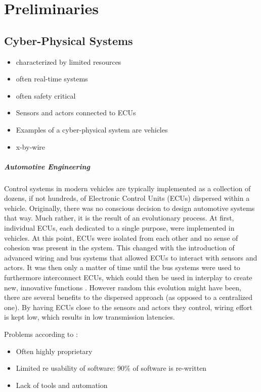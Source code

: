 

\chapter{Preliminaries}\label{chapter:preliminaries}

\section{Cyber-Physical Systems}

\begin{itemize}
\item characterized by limited resources
\item often real-time systems
\item often safety critical
\item Sensors and actors connected to ECUs
\item Examples of a cyber-physical system are vehicles
\item x-by-wire
\end{itemize}


\paragraph{Automotive Engineering}
Control systems in modern vehicles are typically implemented as a collection of dozens, if not hundreds, of Electronic Control Units (ECUs) dispersed within a vehicle. Originally, there was no conscious decision to design automotive systems that way. Much rather, it is the result of an evolutionary process. At first, individual ECUs, each dedicated to a single purpose, were implemented in vehicles. At this point, ECUs were isolated from each other and no sense of cohesion was present in the system. This changed with the introduction of advanced wiring and bus systems that allowed ECUs to interact with sensors and actors. It was then only a matter of time until the bus systems were used to furthermore interconnect ECUs, which could then be used in interplay to create new, innovative functions \cite{broy2006challenges}. However random this evolution might have been, there are several benefits to the dispersed approach (as opposed to a centralized one). By having ECUs close to the sensors and actors they control, wiring effort is kept low, which results in low transmission latencies. 

Problems according to \citeauthor*{broy2006challenges}:
\begin{itemize}
\item Often highly proprietary
\item Limited re usability of software: 90\% of software is re-written 
\item Lack of tools and automation
\end{itemize}


